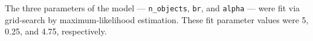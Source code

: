 \documentclass[10pt,letterpaper]{article}
\begin{document}
The three parameters of the model --- \lstinline{n_objects}, \lstinline{br}, and \lstinline{alpha} --- were fit via grid-search by maximum-likelihood estimation. These fit parameter values were 5, 0.25, and 4.75, respectively.%


%
%
%
%
%
%
%
\end{document}
